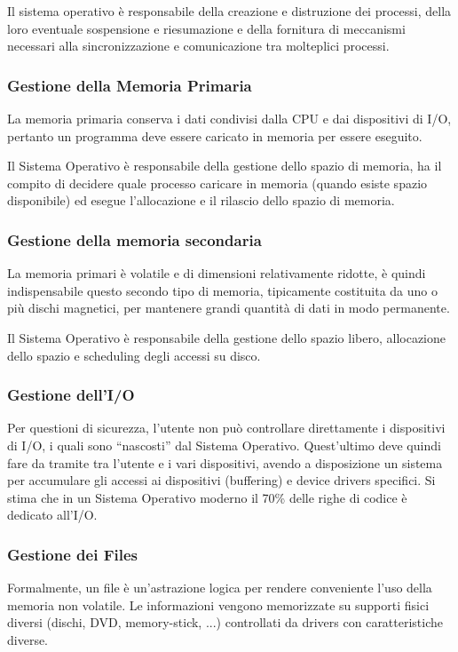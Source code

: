 \documentclass[a4paper]{article}
\begin{document}
Il sistema operativo è responsabile della creazione e distruzione dei processi, della loro eventuale sospensione e riesumazione e della fornitura di meccanismi necessari alla sincronizzazione e comunicazione tra molteplici processi.

\subsubsection{Gestione della Memoria Primaria}
La memoria primaria conserva i dati condivisi dalla CPU e dai dispositivi di I/O, pertanto un programma deve essere caricato in memoria per essere eseguito.

Il Sistema Operativo è responsabile della gestione dello spazio di memoria, ha il compito di decidere quale processo caricare in memoria (quando esiste spazio disponibile) ed esegue l'allocazione e il rilascio dello spazio di memoria.

\subsubsection{Gestione della memoria secondaria}
La memoria primari è volatile e di dimensioni relativamente ridotte, è quindi indispensabile questo secondo tipo di memoria, tipicamente costituita da uno o più dischi magnetici, per mantenere grandi quantità di dati in modo permanente.

Il Sistema Operativo è responsabile della gestione dello spazio libero, allocazione dello spazio e scheduling degli accessi su disco.

\subsubsection{Gestione dell'I/O}
Per questioni di sicurezza, l'utente non può controllare direttamente i dispositivi di I/O, i quali sono ``nascosti'' dal Sistema Operativo. Quest'ultimo deve quindi fare da tramite tra l'utente e i vari dispositivi, avendo a disposizione un sistema per accumulare gli accessi ai dispositivi (buffering) e device drivers specifici. Si stima che in un Sistema Operativo moderno il 70\% delle righe di codice è dedicato all'I/O.

\subsubsection{Gestione dei Files}
Formalmente, un file è un'astrazione logica per rendere conveniente l'uso della memoria non volatile. Le informazioni vengono memorizzate su supporti fisici diversi (dischi, DVD, memory-stick, ...) controllati da drivers con caratteristiche diverse.
\end{document}
